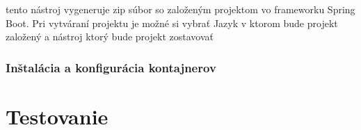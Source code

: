 tento nástroj vygeneruje zip súbor so založeným projektom vo frameworku Spring Boot. Pri vytváraní projektu je možné si vybrať Jazyk v ktorom bude projekt založený a nástroj ktorý bude projekt zostavovať %

\subsubsection{Inštalácia a konfigurácia kontajnerov} 

  

  

  

  

\section{Testovanie} 


  
